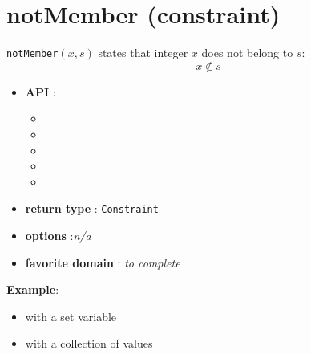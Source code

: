 \label{notmember}
\hypertarget{notmember}{}

\section{notMember (constraint)}\label{notmember:notmemberconstraint}\hypertarget{notmember:notmemberconstraint}{}
\begin{notedef}
\texttt{notMember}$(x,s)$ states that integer $x$ does not belong to $s$:
$$x\not\in s$$  
\end{notedef}

\begin{itemize}
	\item \textbf{API} :
	\begin{itemize}
		\item {}
		\item {}
		\item {}
		\item {}
		\item {}
	\end{itemize}
	\item \textbf{return type} : \texttt{Constraint}
	\item \textbf{options} :\emph{n/a}
	\item \textbf{favorite domain} : \emph{to complete}
\end{itemize}

\textbf{Example}:
\begin{itemize}
\item with a set variable
\end{itemize}


\begin{itemize}
\item with a collection of values
\end{itemize}

